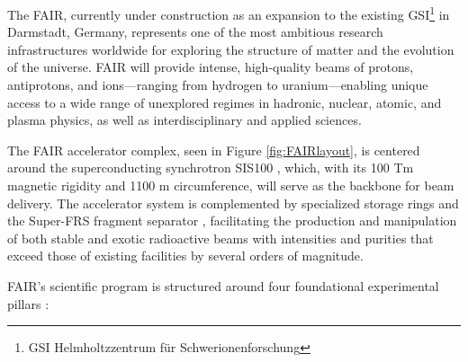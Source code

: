 The \gls{FAIR}, currently under construction as an expansion to the existing GSI\footnote{GSI Helmholtzzentrum für Schwerionenforschung} in Darmstadt, Germany, represents one of the most ambitious research infrastructures worldwide for exploring the structure of matter and the evolution of the universe. \gls{FAIR} will provide intense, high-quality beams of protons, antiprotons, and ions—ranging from hydrogen to uranium—enabling unique access to a wide range of unexplored regimes in hadronic, nuclear, atomic, and plasma physics, as well as interdisciplinary and applied sciences.

The \gls{FAIR} accelerator complex, seen in Figure \ref{fig:FAIRlayout}, is centered around the superconducting synchrotron SIS100 \cite{sis100_fair_2020}, which, with its 100 Tm magnetic rigidity and 1100 m circumference, will serve as the backbone for beam delivery. The accelerator system is complemented by specialized storage rings and the Super-FRS fragment separator \cite{superfrs_status_2008}, facilitating the production and manipulation of both stable and exotic radioactive beams with intensities and purities that exceed those of existing facilities by several orders of magnitude.

\gls{FAIR}'s scientific program is structured around four foundational experimental pillars \cite{123_FAIR,rosner_future_2007,stoecker_fair_2011}:

